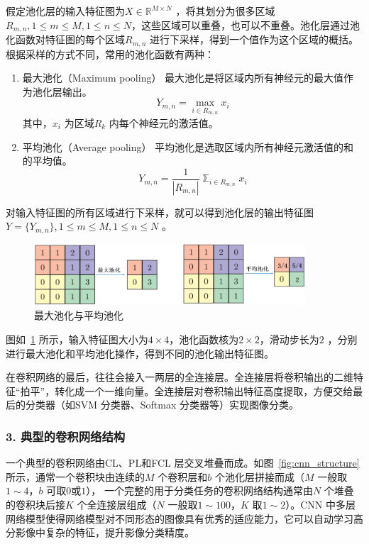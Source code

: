 假定池化层的输入特征图为$X \in \mathbb{R}^{M \times N}$ ，将其划分为很多区域$R_{m,n},1 \leq m \leq M, 1 \leq n \leq N$，这些区域可以重叠，也可以不重叠。池化层通过池化函数对特征图的每个区域$R_{m,n}$ 进行下采样，得到一个值作为这个区域的概括。根据采样的方式不同，常用的池化函数有两种：
\begin{enumerate}[1. ]
  \label{list:1}
  \item 最大池化（Maximum pooling）
        最大池化是将区域内所有神经元的最大值作为池化层输出。
        \begin{equation}
          \label{eq:2-18}
          Y_{m,n} = \mathop{\max}_{i \in R_{m,n}} x_i
        \end{equation}
        其中，$x_i$ 为区域$R_k$ 内每个神经元的激活值。

  \item 平均池化（Average pooling）
        平均池化是选取区域内所有神经元激活值的和的平均值。
        \begin{equation}
          \label{eq:2-19}
          Y_{m,n} =  \frac{1}{|R_{m,n}|}\mathbb{\sum}_{i \in R_{m,n}} x_i
        \end{equation}
\end{enumerate}
对输入特征图的所有区域进行下采样，就可以得到池化层的输出特征图$Y = \{ Y_{m,n}\},1 \leq m \leq M, 1 \leq n \leq N$ 。

\begin{figure}[htbp]
  \centering
  \includegraphics[width=0.9\textwidth]{figures/pooling}
  \caption{最大池化与平均池化}\label{fig:pooling}
\end{figure}

图如~\ref{fig:pooling} 所示，输入特征图大小为$4 \times 4$，池化函数核为$2 \times 2$，滑动步长为$2$ ，分别进行最大池化和平均池化操作，得到不同的池化输出特征图。

在卷积网络的最后，往往会接入一两层的全连接层。全连接层将卷积输出的二维特征“拍平”，转化成一个一维向量。全连接层对卷积输出特征高度提取，方便交给最后的分类器（如SVM 分类器、Softmax 分类器等）实现图像分类。

\subsubsection*{3. 典型的卷积网络结构}
\label{subsec:chap02-2-1-3}
一个典型的卷积网络由CL、PL和FCL 层交叉堆叠而成。如图~\ref{fig:cnn_structure} 所示，通常一个卷积块由连续的$M$ 个卷积层和$b$ 个池化层拼接而成（$M$ 一般取$1\sim 4$，$b$ 可取$0$或$1$）， 一个完整的用于分类任务的卷积网络结构通常由$N$ 个堆叠的卷积块后接$K$ 个全连接层组成（$N$ 一般取$1\sim 100$，$K$ 取$1 \sim 2$）。CNN 中多层网络模型使得网络模型对不同形态的图像具有优秀的适应能力，它可以自动学习高分影像中复杂的特征，提升影像分类精度。

